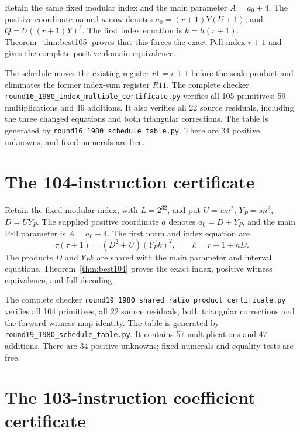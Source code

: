 \documentclass[11pt,letterpaper]{article}
\theoremstyle{definition}
\theoremstyle{remark}
\numberwithin{equation}{section}
\newcommand{\file}[1]{\texttt{#1}}
\begin{document}
Retain the same fixed modular index and the main parameter $A=a_0+4$.
The positive coordinate named $a$ now denotes
$a_0=(r+1)Y(U+1)$, and $Q=U((r+1)Y)^2$. The first index equation is
$k=h(r+1)$. Theorem~\ref{thm:best105} proves that this forces the exact
Pell index $r+1$ and gives the complete positive-domain equivalence.

The schedule moves the existing register $r1=r+1$ before the scale
product and eliminates the former index-sum register $R11$. The
complete checker
\file{round16\_1980\_index\_multiple\_certificate.py} verifies all
105 primitives: 59 multiplications and 46 additions. It also verifies
all 22 source residuals, including the three changed equations and both
triangular corrections. The table is generated by
\file{round16\_1980\_schedule\_table.py}. There are 34 positive
unknowns, and fixed numerals are free.

\small


\clearpage\normalsize
\section{The 104-instruction certificate}\label{app:104}

Retain the fixed modular index, with $L=2^{32}$, and put
$U=wn^2$, $Y_P=sn^2$, $D=UY_P$. The supplied positive coordinate
$a$ denotes $a_0=D+Y_P$, and the main Pell parameter is $A=a_0+4$.
The first norm and index equation are
\[
 \tau(\tau+1)=(D^2+U)(Y_Pk)^2,\qquad k=r+1+hD.
\]
The products $D$ and $Y_Pk$ are shared with the main parameter and
interval equations. Theorem~\ref{thm:best104} proves the exact index,
positive witness equivalence, and full decoding.

The complete checker
\file{round19\_1980\_shared\_ratio\_product\_certificate.py}
verifies all 104 primitives, all 22 source residuals, both triangular
corrections and the forward witness-map identity. The table is generated
by \file{round19\_1980\_schedule\_table.py}. It contains 57
multiplications and 47 additions. There are 34 positive unknowns;
fixed numerals and equality tests are free.

\small


\clearpage\normalsize
\section{The 103-instruction coefficient certificate}\label{app:103}
\end{document}

